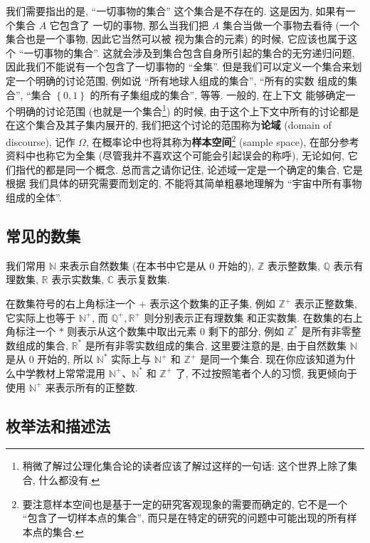 \documentclass[10pt,UTF8]{book} %
\begin{document}
我们需要指出的是, “一切事物的集合” 这个集合是不存在的. 这是因为, 如果有一个集合 $A$ 它包含了
一切的事物, 那么当我们把 $A$ 集合当做一个事物去看待 (一个集合也是一个事物, 因此它当然可以被
视为集合的元素) 的时候, 它应该也属于这个 “一切事物的集合”.
这就会涉及到集合包含自身所引起的集合的无穷递归问题, 因此我们不能说有一个包含了一切事物的 “全集”.
但是我们可以定义一个集合来划定一个明确的讨论范围, 例如说 “所有地球人组成的集合”, “所有的实数
组成的集合”, “集合 $\left\{ 0, 1 \right\}$ 的所有子集组成的集合”, 等等. 一般的, 在上下文
能够确定一个明确的讨论范围 (也就是一个集合\footnote{
    稍微了解过公理化集合论的读者应该了解过这样的一句话: 这个世界上除了集合, 什么都没有.
}) 的时候, 由于这个上下文中所有的讨论都是在这个集合及其子集内展开的,
我们把这个讨论的范围称为\textbf{论域} (domain of discourse), 记作 $\varOmega$, 
在概率论中也将其称为\textbf{样本空间}\footnote{
    要注意样本空间也是基于一定的研究客观现象的需要而确定的, 它不是一个 “包含了一切样本点的集合”,
    而只是在特定的研究的问题中可能出现的所有样本点的集合.
} (sample space), 在部分参考资料中也称它为全集 (尽管我并不喜欢这个可能会引起误会的称呼), 
无论如何, 它们指代的都是同一个概念. 总而言之请你记住, 论述域一定是一个确定的集合, 它是根据
我们具体的研究需要而划定的, 不能将其简单粗暴地理解为 “宇宙中所有事物组成的全体”.

\subsection{常见的数集}

我们常用 $\mathbb{N}$ 来表示自然数集 (在本书中它是从 $0$ 开始的), $\mathbb{Z}$ 表示整数集,
$\mathbb{Q}$ 表示有理数集, $\mathbb{R}$ 表示实数集, $\mathbb{C}$ 表示复数集.

在数集符号的右上角标注一个 $+$ 表示这个数集的正子集, 例如 $\mathbb{Z}^+$ 表示正整数集,
它实际上也等于 $\mathbb{N}^+$, 而 $\mathbb{Q}^+, \mathbb{R}^+$ 则分别表示正有理数集
和正实数集. 在数集的右上角标注一个 $*$ 则表示从这个数集中取出元素 $0$ 剩下的部分, 例如
$\mathbb{Z}^*$ 是所有非零整数组成的集合, $\mathbb{R}^*$ 是所有非零实数组成的集合.
这里要注意的是, 由于自然数集 $\mathbb{N}$ 是从 $0$ 开始的, 所以 $\mathbb{N}^*$
实际上与 $\mathbb{N}^+$ 和 $\mathbb{Z}^+$ 是同一个集合.
现在你应该知道为什么中学教材上常常混用 $\mathbb{N}^+$、$\mathbb{N}^*$ 和 $\mathbb{Z}^+$
了, 不过按照笔者个人的习惯, 我更倾向于使用 $\mathbb{N}^+$ 来表示所有的正整数.

\subsection{枚举法和描述法}
\end{document}

